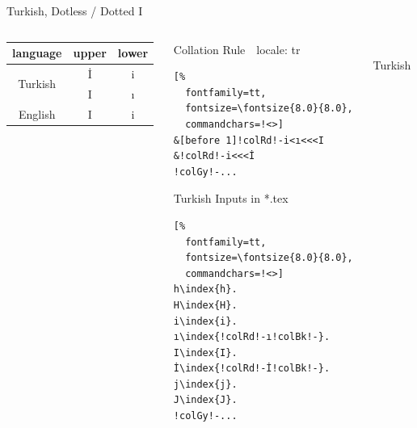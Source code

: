 \documentclass[aspectratio=169,10pt]{beamer}
\begin{document}
\begin{frame}[fragile]{Turkish, Dotless / Dotted I}

\begin{columns}
\begin{column}{47mm}
\setmainfont{Noto Serif}
\setsansfont{Noto Sans}
\normalsize
\begin{tabular}{c|cc}
language & upper & lower \\\hline\hline
\multirow{2}{*}{Turkish}
        & İ & i \\
        & I & ı \\\hline
English & I & i \\
\end{tabular}
\end{column}

\begin{column}{40mm}
\setmonofont{Noto Sans}
\begin{block}{Collation Rule~~\scriptsize locale: tr}
\begin{Verbatim}[%
  fontfamily=tt,
  fontsize=\fontsize{8.0}{8.0},
  commandchars=!<>]
&[before 1]!colRd!-i<ı<<<I
&!colRd!-i<<<İ
!colGy!-...
\end{Verbatim}
\end{block}
\begin{exampleblock}{Turkish Inputs in *.tex}
\begin{Verbatim}[%
  fontfamily=tt,
  fontsize=\fontsize{8.0}{8.0},
  commandchars=!<>]
h\index{h}.
H\index{H}.
i\index{i}.
ı\index{!colRd!-ı!colBk!-}.
I\index{I}.
İ\index{!colRd!-İ!colBk!-}.
j\index{j}.
J\index{J}.
!colGy!-...
\end{Verbatim}
\end{exampleblock}
\end{column}

\begin{column}{43mm}
\begin{center}
\\[2mm]%
Turkish
\end{center}
\end{column}
\end{columns}

\end{frame}

\end{document}
